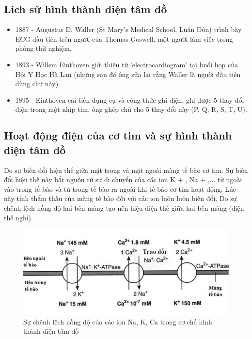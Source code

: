 \subsection{Lich sử hình thành điện tâm đồ}
\begin{itemize}
    \item 1887 - Augustus D. Waller (St Mary's Medical School, Luân Đôn) trình bày ECG đầu tiên trên người của Thomas Goswell, một người làm việc trong phòng thử nghiệm.
    \item 1893 - Willem Einthoven giới thiệu từ 'electrocardiogram' tại buổi họp của Hội Y Học Hà Lan (nhưng sau đó ông sửa lại rằng Waller là người đầu tiên dùng chữ này).
    \item 1895 - Einthoven cải tiến dụng cụ và công thức ghi điện, ghi được 5 thay đổi điện trong một nhịp tim, ông ghép chữ cho 5 thay đổi này (P, Q, R, S, T, U).
\end{itemize}

\subsection{Hoạt động điện của cơ tim và sự hình thành điện tâm đồ}
Do sự biến đổi hiệu thế giữa mặt trong và mặt ngoài màng tế bào cơ tim. Sự biến đổi hiệu thế này bắt nguồn từ sự di chuyển của các ion K + , Na + ,... từ ngoài vào trong tế bào và từ trong tế bào ra ngoài khi tế bào cơ tim hoạt động. Lúc này tính thẩm thấu của màng tế bào đối với các ion luôn luôn biến đổi. Do sự chênh lệch nồng độ hai bên màng tạo nên hiệu điện thế giữa hai bên màng (điện thế nghỉ).
\begin{center}
    \begin{figure}[htp]
    \begin{center}
     \includegraphics[scale=.4]{image/week1/h21.png}
    \end{center}
    \caption[Sự chênh lệch nồng độ của các ion]{Sự chênh lệch nồng độ của các ion Na, K, Ca trong cơ chế hình thành điện tâm đồ \cite{huongdanDTT}}
    \end{figure}
\end{center}

